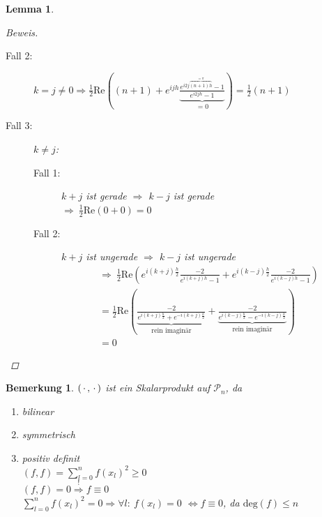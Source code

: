 \documentclass[12pt]{article}
\theoremstyle{break}
\newtheorem{lemma}[theorem]{Lemma}
\newtheorem*{comment*}{Bemerkung}
\begin{document}
\begin{lemma}
\begin{proof}[Beweis]
\begin{description}
  \item[Fall 2:] $k=j\neq0 \Rightarrow \frac{1}{2} \text{Re} \left( (n+1) + e^{ijh} \underbrace{\frac{e^{i2j\overbrace{(n+1)h}^{= \pi}}-1}{e^{i2jh}-1}}_{=0}\right) = \frac{1}{2} (n+1)$ 
  \item[Fall 3:] $k \neq j$:
    \begin{description}
      \item[Fall 1:] $k+j$ ist gerade $\Rightarrow$ $k-j$ ist gerade \\
        $\Rightarrow \medspace \frac{1}{2} \text{Re} \left(0+0\right) = 0$
      \item[Fall 2:] $k+j$ ist ungerade $\Rightarrow$ $k-j$ ist ungerade \\
        \begin{align*}
        &\Rightarrow \medspace  \frac{1}{2} \text{Re} \left( e^{i(k+j)\frac{h}{2}} \frac{-2}{ e^{i(k+j)h} - 1} + e^{i(k-j)\frac{h}{2}} \frac{-2}{ e^{i(k-j)h} - 1}\right)&\\
        &= \frac{1}{2} \text{Re} \left(\underbrace{\frac{-2}{ e^{i(k+j)\frac{h}{2}} + e^{-i(k+j)\frac{h}{2}}}}_{\text{rein imaginär}} +  \underbrace{\frac{-2}{ e^{i(k-j)\frac{h}{2}} - e^{-i(k-j)\frac{h}{2}}}}_{\text{rein imaginär}}\right)&\\
        &= 0
        \end{align*}
    \end{description}
\end{description}
\end{proof}
\end{lemma}

\begin{comment*}
$(\thinspace \cdot \thinspace, \thinspace \cdot \thinspace )$ ist ein Skalarprodukt auf $\mathcal{P}_n$, da 
\begin{enumerate}
  \item[i)] bilinear
  \item[ii)] symmetrisch
  \item[iii)] positiv definit \\
    $(f,f) = \sum_{l=0}^n f(x_l)^2 \geq 0$\\
    $(f,f) = 0 \overset{!}{\Rightarrow} f \equiv 0$\\
    $\sum_{l=0}^n f(x_l)^2 = 0 \Rightarrow \forall l: \medspace f(x_l) = 0$
    $\Leftrightarrow f \equiv 0$, da $\text{deg}(f) \leq n$ 
\end{enumerate}
\end{comment*}
\end{document}
